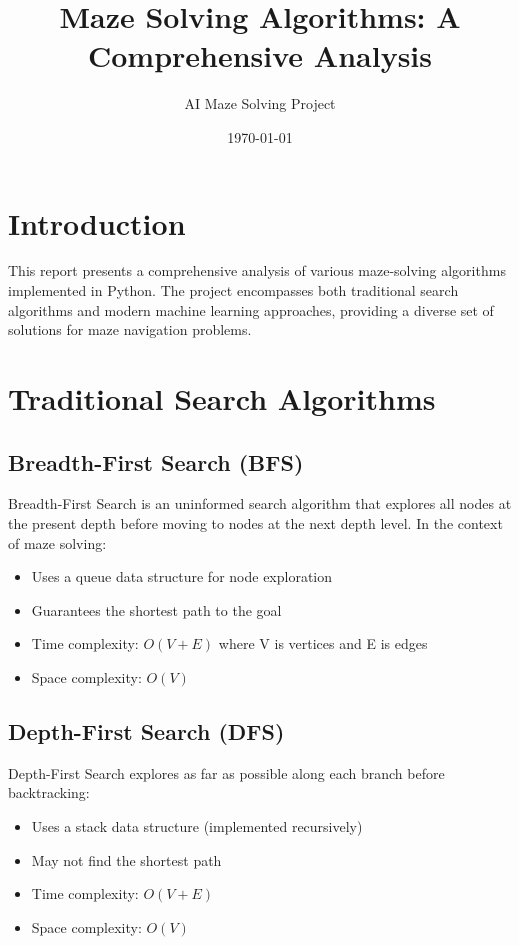 \documentclass[12pt,a4paper]{article}
\title{Maze Solving Algorithms: A Comprehensive Analysis}
\author{AI Maze Solving Project}
\date{\today}
\begin{document}
\maketitle

\section{Introduction}
This report presents a comprehensive analysis of various maze-solving algorithms implemented in Python. The project encompasses both traditional search algorithms and modern machine learning approaches, providing a diverse set of solutions for maze navigation problems.

\section{Traditional Search Algorithms}

\subsection{Breadth-First Search (BFS)}
Breadth-First Search is an uninformed search algorithm that explores all nodes at the present depth before moving to nodes at the next depth level. In the context of maze solving:

\begin{itemize}
    \item Uses a queue data structure for node exploration
    \item Guarantees the shortest path to the goal
    \item Time complexity: $O(V + E)$ where V is vertices and E is edges
    \item Space complexity: $O(V)$
\end{itemize}

\subsection{Depth-First Search (DFS)}
Depth-First Search explores as far as possible along each branch before backtracking:

\begin{itemize}
    \item Uses a stack data structure (implemented recursively)
    \item May not find the shortest path
    \item Time complexity: $O(V + E)$
    \item Space complexity: $O(V)$
\end{itemize}
\end{document}
